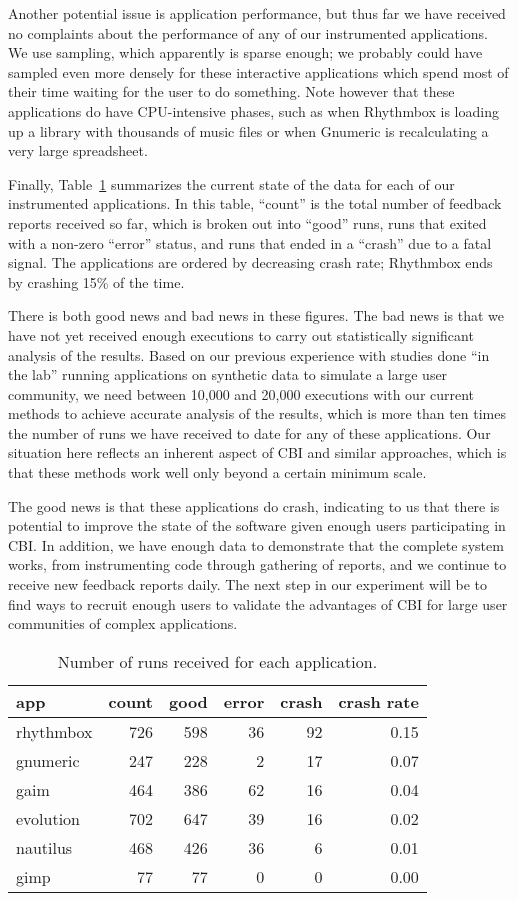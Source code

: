 \documentclass[times,10pt,twocolumn]{article}
\begin{document}
Another potential issue is application performance, but thus far we
have received no complaints about the performance of any of our
instrumented applications.  We use  sampling, which
apparently is sparse enough; we probably could have sampled even more
densely for these interactive applications which spend most of their
time waiting for the user to do something.  Note however that 
these applications do have CPU-intensive phases, such as when
Rhythmbox is loading up a library with thousands of music files or
when Gnumeric is recalculating a very large spreadsheet.

Finally, Table~\ref{reports-per-app} summarizes the current state of
the data for each of our instrumented applications.  In this table,
``count'' is the total number of feedback reports received so far,
which is broken out into ``good'' runs, runs that exited with a
non-zero ``error'' status, and runs that ended in a ``crash'' due to a
fatal signal.  The applications are ordered by decreasing crash rate;
Rhythmbox ends by crashing 15\% of the time.

There is both good news and bad news in these figures.  The bad news
is that we have not yet received enough executions to carry out
statistically significant analysis of the results.  Based on our
previous experience with studies done ``in the lab'' running
applications on synthetic data to simulate a large user community, we
need between 10,000 and 20,000 executions with our current methods to
achieve accurate analysis of the results, which is more than ten times
the number of runs we have received to date for any of these
applications.  Our situation here reflects an inherent aspect of CBI
and similar approaches, which is that these methods work well only
beyond a certain minimum scale.

The good news is that these applications do crash,
indicating to us that there is potential to improve the state
of the software given enough users participating in CBI.  In addition,
we have enough data to demonstrate that the complete system works, from
instrumenting code through gathering of reports, and we continue to
receive new feedback reports daily.  The next step in our experiment will be
to find ways to recruit enough users to validate the advantages of CBI
for large user communities of complex applications.


\begin{table}
  \centering
  \begin{tabular}{lrrrrr}
    app & count & good & error & crash & crash rate \\ \hline
    rhythmbox & 726 & 598 & 36 & 92 & 0.15 \\
    gnumeric & 247 & 228 & 2 & 17 & 0.07 \\
    gaim & 464 & 386 & 62 & 16 & 0.04 \\
    evolution & 702 & 647 & 39 & 16 & 0.02 \\
    nautilus & 468 & 426 & 36 & 6 & 0.01 \\
    gimp & 77 & 77 & 0 & 0 & 0.00
  \end{tabular}
  \caption{Number of runs received for each application.}  
  \label{reports-per-app}
\end{table}


\end{document}
